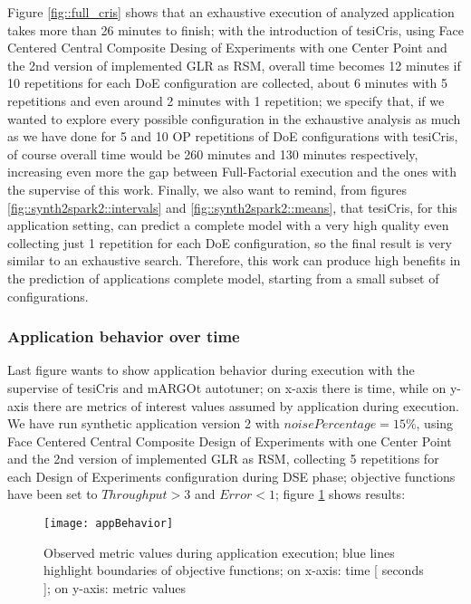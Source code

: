 Figure \ref{fig::full_cris} shows that an exhaustive execution of analyzed application takes more than 26 minutes to finish; with the introduction of tesiCris, using Face Centered Central Composite Desing of Experiments with one Center Point and the 2nd version of implemented GLR as RSM, overall time becomes 12 minutes if 10 repetitions for each DoE configuration are collected, about 6 minutes with 5 repetitions and even around 2 minutes with 1 repetition; we specify that, if we wanted to explore every possible configuration in the exhaustive analysis as much as we have done for 5 and 10 OP repetitions of DoE configurations with tesiCris, of course overall time would be 260 minutes and 130 minutes respectively, increasing even more the gap between Full-Factorial execution and the ones with the supervise of this work. Finally, we also want to remind, from figures \ref{fig::synth2spark2::intervals} and \ref{fig::synth2spark2::means}, that tesiCris, for this application setting, can predict a complete model with a very high quality even collecting just 1 repetition for each DoE configuration, so the final result is very similar to an exhaustive search. Therefore, this work can produce high benefits in the prediction of applications complete model, starting from a small subset of configurations.


\subsubsection{Application behavior over time}

Last figure wants to show application behavior during execution with the supervise of tesiCris and mARGOt autotuner; on x-axis there is time, while on y-axis there are metrics of interest values assumed by application during execution. We have run synthetic application version 2 with $noisePercentage = 15\%$, using Face Centered Central Composite Design of Experiments with one Center Point and the 2nd version of implemented GLR as RSM, collecting 5 repetitions for each Design of Experiments configuration during DSE phase; objective functions have been set to $Throughput > 3$ and $Error < 1$; figure \ref{fig::appBeh} shows results:

\begin{figure}[H]

    \centering
    \texttt{[image: appBehavior]}
    \caption{Observed metric values during application execution; blue lines highlight boundaries of objective functions; on x-axis: time [ seconds ]; on y-axis: metric values}
    \label{fig::appBeh}
    
\end{figure}

